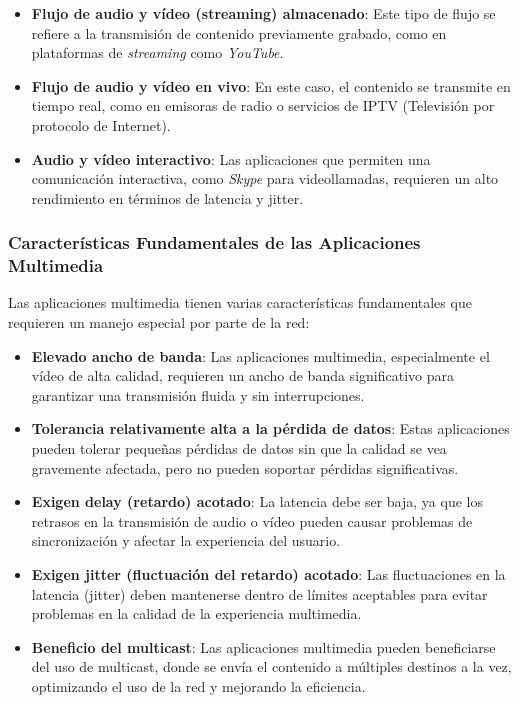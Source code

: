\documentclass[a4paper,12pt]{article}
\begin{document}
\begin{itemize}
    \item \textbf{Flujo de audio y vídeo (streaming) almacenado}: Este tipo de flujo se refiere a la transmisión de contenido previamente grabado, como en plataformas de \textit{streaming} como \textit{YouTube}.
    \item \textbf{Flujo de audio y vídeo en vivo}: En este caso, el contenido se transmite en tiempo real, como en emisoras de radio o servicios de IPTV (Televisión por protocolo de Internet).
    \item \textbf{Audio y vídeo interactivo}: Las aplicaciones que permiten una comunicación interactiva, como \textit{Skype} para videollamadas, requieren un alto rendimiento en términos de latencia y jitter.
\end{itemize}

\subsubsection{Características Fundamentales de las Aplicaciones Multimedia}

Las aplicaciones multimedia tienen varias características fundamentales que requieren un manejo especial por parte de la red:

\begin{itemize}
    \item \textbf{Elevado ancho de banda}: Las aplicaciones multimedia, especialmente el vídeo de alta calidad, requieren un ancho de banda significativo para garantizar una transmisión fluida y sin interrupciones.
    \item \textbf{Tolerancia relativamente alta a la pérdida de datos}: Estas aplicaciones pueden tolerar pequeñas pérdidas de datos sin que la calidad se vea gravemente afectada, pero no pueden soportar pérdidas significativas.
    \item \textbf{Exigen delay (retardo) acotado}: La latencia debe ser baja, ya que los retrasos en la transmisión de audio o vídeo pueden causar problemas de sincronización y afectar la experiencia del usuario.
    \item \textbf{Exigen jitter (fluctuación del retardo) acotado}: Las fluctuaciones en la latencia (jitter) deben mantenerse dentro de límites aceptables para evitar problemas en la calidad de la experiencia multimedia.
    \item \textbf{Beneficio del multicast}: Las aplicaciones multimedia pueden beneficiarse del uso de multicast, donde se envía el contenido a múltiples destinos a la vez, optimizando el uso de la red y mejorando la eficiencia.
\end{itemize}
\end{document}
